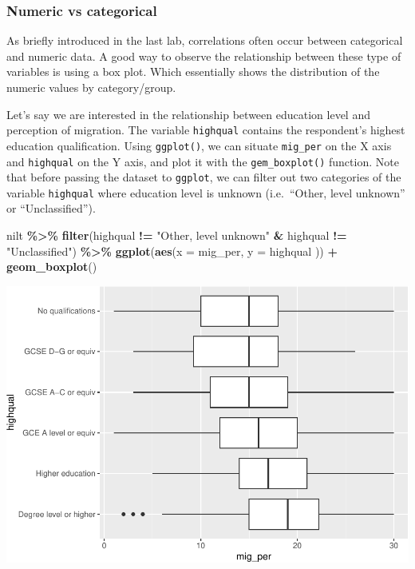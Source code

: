 \documentclass[
]{book}
\newenvironment{Shaded}{\begin{snugshade}}{\end{snugshade}}
\newcommand{\AttributeTok}[1]{\textcolor[rgb]{0.13,0.29,0.53}{#1}}
\newcommand{\FunctionTok}[1]{\textcolor[rgb]{0.13,0.29,0.53}{\textbf{#1}}}
\newcommand{\NormalTok}[1]{#1}
\newcommand{\SpecialCharTok}[1]{\textcolor[rgb]{0.81,0.36,0.00}{\textbf{#1}}}
\newcommand{\StringTok}[1]{\textcolor[rgb]{0.31,0.60,0.02}{#1}}
\begin{document}
\hypertarget{numeric-vs-categorical}{%
\subsubsection{Numeric vs categorical}\label{numeric-vs-categorical}}

As briefly introduced in the last lab, correlations often occur between categorical and numeric data. A good way to observe the relationship between these type of variables is using a box plot. Which essentially shows the distribution of the numeric values by category/group.

Let's say we are interested in the relationship between education level and perception of migration. The variable \texttt{highqual} contains the respondent's highest education qualification. Using \texttt{ggplot()}, we can situate \texttt{mig\_per} on the X axis and \texttt{highqual} on the Y axis, and plot it with the \texttt{gem\_boxplot()} function. Note that before passing the dataset to \texttt{ggplot}, we can filter out two categories of the variable \texttt{highqual} where education level is unknown (i.e.~``Other, level unknown'' or ``Unclassified'').

\begin{Shaded}
\begin{Highlighting}[]
\NormalTok{nilt }\SpecialCharTok{\%\textgreater{}\%} 
  \FunctionTok{filter}\NormalTok{(highqual }\SpecialCharTok{!=} \StringTok{"Other, level unknown"} \SpecialCharTok{\&}\NormalTok{ highqual }\SpecialCharTok{!=} \StringTok{"Unclassified"}\NormalTok{) }\SpecialCharTok{\%\textgreater{}\%} 
  \FunctionTok{ggplot}\NormalTok{(}\FunctionTok{aes}\NormalTok{(}\AttributeTok{x =}\NormalTok{ mig\_per, }\AttributeTok{y =}\NormalTok{ highqual )) }\SpecialCharTok{+}
  \FunctionTok{geom\_boxplot}\NormalTok{()}
\end{Highlighting}
\end{Shaded}

\begin{flushleft}\includegraphics[width=1\linewidth]{lab-workbook_files/figure-latex/unnamed-chunk-79-1} \end{flushleft}
\end{document}

